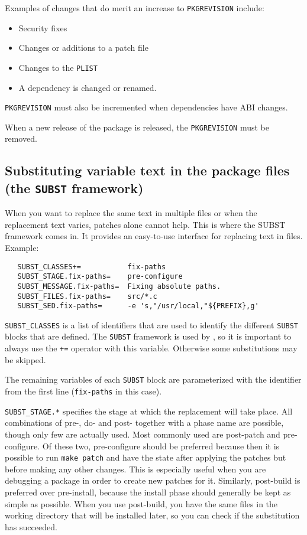 Examples of changes that do merit an increase to {\tt PKGREVISION} include:
\begin{itemize}
   \item Security fixes
   \item Changes or additions to a patch file
   \item Changes to the {\tt PLIST}
   \item A dependency is changed or renamed.
\end{itemize}

{\tt PKGREVISION} must also be incremented when dependencies have ABI changes.

When a new release of the package is released, the {\tt PKGREVISION} must be
removed.


\subsection{Substituting variable text in the package files
(the {\tt SUBST} framework)} %
\label{section:genvars:SUBST}

When you want to replace the same text in multiple files or when the
replacement text varies, patches alone cannot help. This is where the SUBST
framework comes in. It provides an easy-to-use interface for replacing text in
files. Example:
\begin{verbatim}
   SUBST_CLASSES+=           fix-paths
   SUBST_STAGE.fix-paths=    pre-configure
   SUBST_MESSAGE.fix-paths=  Fixing absolute paths.
   SUBST_FILES.fix-paths=    src/*.c
   SUBST_SED.fix-paths=      -e 's,"/usr/local,"${PREFIX},g'
\end{verbatim}

{\tt SUBST\_CLASSES}  is a list  of identifiers that  are used to  identify the
different {\tt  SUBST} blocks  that are defined.  The {\tt SUBST}  framework is
used by  \robotpkg{}, so it  is important to  always use the {\tt  +=} operator
with this variable. Otherwise some substitutions may be skipped.

The remaining  variables of each {\tt  SUBST} block are  parameterized with the
identifier from the first line ({\tt fix-paths} in this case).

{\tt SUBST\_STAGE.*}  specifies the  stage at which  the replacement  will take
place. All combinations  of pre-, do- and post- together with  a phase name are
possible, though only few are  actually used. Most commonly used are post-patch
and pre-configure. Of these two, pre-configure should be preferred because then
it is possible  to run {\tt make  patch} and have the state  after applying the
patches but before making any other changes. This is especially useful when you
are debugging  a package  in order  to create new  patches for  it.  Similarly,
post-build  is preferred  over pre-install,  because the  install  phase should
generally be kept as simple as  possible. When you use post-build, you have the
same files  in the working directory that  will be installed later,  so you can
check if the substitution has succeeded.


